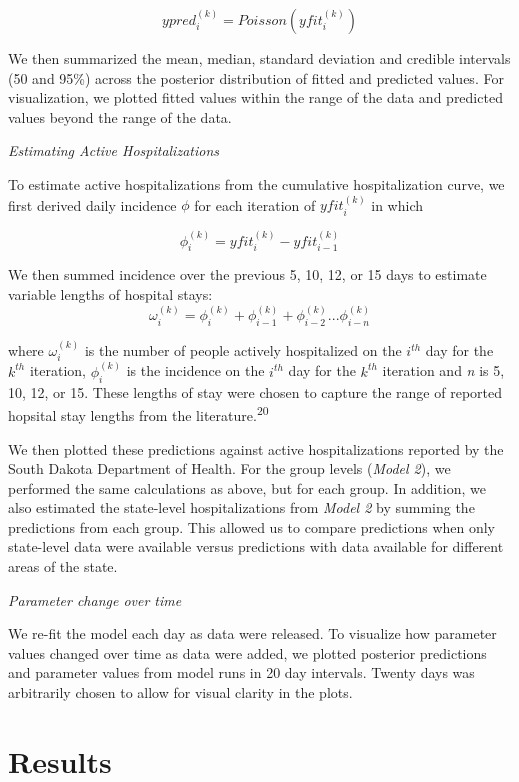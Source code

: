\documentclass[
]{article}
\begin{document}
\[ypred_i^{(k)} = Poisson(yfit_i^{(k)})\]

We then summarized the mean, median, standard deviation and credible intervals (50 and 95\%) across the posterior distribution of fitted and predicted values. For visualization, we plotted fitted values within the range of the data and predicted values beyond the range of the data.

\emph{Estimating Active Hospitalizations}

To estimate active hospitalizations from the cumulative hospitalization curve, we first derived daily incidence \(\phi\) for each iteration of \(yfit_i^{(k)}\) in which

\[\phi_{i}^{(k)} = yfit_i^{(k)} - yfit_{i-1}^{(k)}\]

We then summed incidence over the previous 5, 10, 12, or 15 days to estimate variable lengths of hospital stays:
\[\omega_i^{(k)} = \phi_i^{(k)} + \phi_{i-1}^{(k)} + \phi_{i-2}^{(k)}...\phi_{i-n}^{(k)}\]

where \(\omega_i^{(k)}\) is the number of people actively hospitalized on the \(i^{th}\) day for the \(k^{th}\) iteration, \(\phi_i^{(k)}\) is the incidence on the \(i^{th}\) day for the \(k^{th}\) iteration and \emph{n} is 5, 10, 12, or 15. These lengths of stay were chosen to capture the range of reported hopsital stay lengths from the literature.\textsuperscript{20}

We then plotted these predictions against active hospitalizations reported by the South Dakota Department of Health. For the group levels (\emph{Model 2}), we performed the same calculations as above, but for each group. In addition, we also estimated the state-level hospitalizations from \emph{Model 2} by summing the predictions from each group. This allowed us to compare predictions when only state-level data were available versus predictions with data available for different areas of the state.

\emph{Parameter change over time}

We re-fit the model each day as data were released. To visualize how parameter values changed over time as data were added, we plotted posterior predictions and parameter values from model runs in 20 day intervals. Twenty days was arbitrarily chosen to allow for visual clarity in the plots.

\hypertarget{results}{%
\section{Results}\label{results}}
\end{document}
